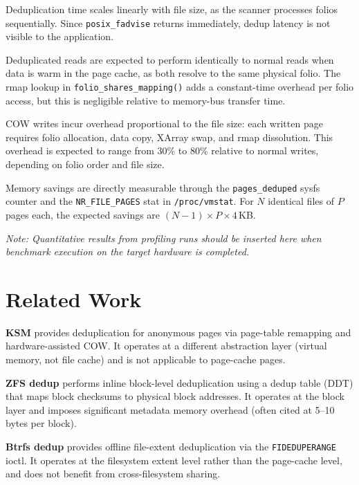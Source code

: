 \documentclass[conference]{IEEEtran}
\begin{document}
Deduplication time scales linearly with file size, as the scanner processes folios sequentially. Since \texttt{posix\_fadvise} returns immediately, dedup latency is not visible to the application.

Deduplicated reads are expected to perform identically to normal reads when data is warm in the page cache, as both resolve to the same physical folio. The rmap lookup in \texttt{folio\_shares\_mapping()} adds a constant-time overhead per folio access, but this is negligible relative to memory-bus transfer time.

COW writes incur overhead proportional to the file size: each written page requires folio allocation, data copy, XArray swap, and rmap dissolution. This overhead is expected to range from 30\% to 80\% relative to normal writes, depending on folio order and file size.

Memory savings are directly measurable through the \texttt{pages\_deduped} sysfs counter and the \texttt{NR\_FILE\_PAGES} stat in \texttt{/proc/vmstat}. For $N$ identical files of $P$ pages each, the expected savings are $(N{-}1) \times P \times 4$\,KB.

\textit{Note: Quantitative results from profiling runs should be inserted here when benchmark execution on the target hardware is completed.}

\section{Related Work}
\label{sec:related}

\textbf{KSM} \cite{b1} provides deduplication for anonymous pages via page-table remapping and hardware-assisted COW. It operates at a different abstraction layer (virtual memory, not file cache) and is not applicable to page-cache pages.

\textbf{ZFS dedup} \cite{b2} performs inline block-level deduplication using a dedup table (DDT) that maps block checksums to physical block addresses. It operates at the block layer and imposes significant metadata memory overhead (often cited at 5--10 bytes per block).

\textbf{Btrfs dedup} provides offline file-extent deduplication via the \texttt{FIDEDUPERANGE} ioctl. It operates at the filesystem extent level rather than the page-cache level, and does not benefit from cross-filesystem sharing.
\end{document}

